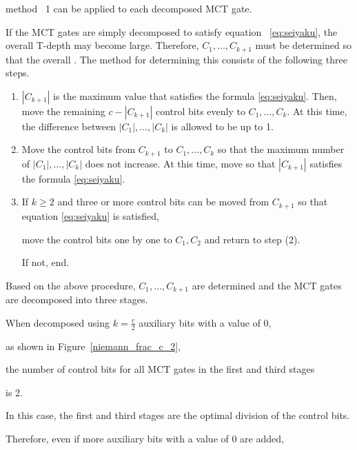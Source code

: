 method ~1 can be applied to each decomposed MCT gate.
\par
If the MCT gates are simply decomposed to satisfy equation ~\ref{eq:seiyaku},
the overall T-depth may become large.
Therefore,
$C_{1},\dots,C_{k+1}$ must be determined so that the overall .
The method for determining this consists of the following three steps.
\begin{enumerate}[Step (1)]
\item $|C_{k+1}|$ is the maximum value that satisfies the formula \ref{eq:seiyaku}.
Then, move the remaining $c-|C_{k+1}|$ control bits evenly to $C_{1},\dots,C_{k}$.
At this time, the difference between $|C_{1}|,\dots,|C_{k}|$ is allowed to be up to 1.
\item Move the control bits from $C_{k+1}$ to $C_{1},\dots,C_{k}$ so that the maximum number of $|C_{1}|,\dots,|C_{k}|$ does not increase.
At this time, move so that $|C_{k+1}|$ satisfies the formula \ref{eq:seiyaku}.
\item
If $k\geq 2$ and three or more control bits can be moved from $C_{k+1}$ so that equation \ref{eq:seiyaku} is satisfied,

move the control bits one by one to $C_{1},C_{2}$ and return to step (2).

If not, end.

\end{enumerate}

Based on the above procedure, $C_{1},\dots,C_{k+1}$ are determined and the MCT gates are decomposed into three stages.

\par
When decomposed using $k=\frac{c}{2}$ auxiliary bits with a value of 0,

as shown in Figure~\ref{niemann_frac_c_2},

the number of control bits for all MCT gates in the first and third stages

is 2.

In this case, the first and third stages are the optimal division of the control bits.

Therefore, even if more auxiliary bits with a value of 0 are added,

